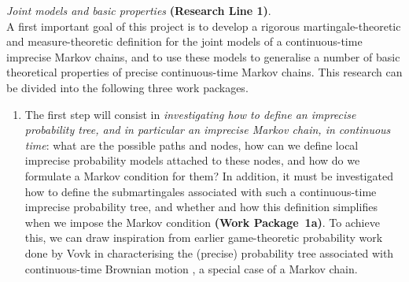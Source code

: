 \documentclass[11pt,dvipsnames,usenames,a4paper]{article}
\begin{document}
\emph{Joint models and basic properties} {\bf (Research Line 1)}.\\[3pt]
A first important goal of this project is to develop a rigorous martingale-theoretic and measure-theoretic definition for the joint models of a continuous-time imprecise Markov chains, and to use these models to generalise a number of basic theoretical properties of precise continuous-time Markov chains. 
This research can be divided into the following three work packages.
\begin{enumerate}[label=\tiny$\blacksquare$,leftmargin=*,noitemsep]
\item The first step will consist in \emph{investigating how to define an imprecise probability tree, and in particular an imprecise Markov chain, in continuous time}: what are the possible paths and nodes, how can we define local imprecise probability models attached to these nodes, and how do we formulate a Markov condition for them?
In addition, it must be investigated how to define the submartingales associated with such a continuous-time imprecise probability tree, and whether and how this definition simplifies when we impose the Markov condition {\bf(Work Package~1a)}.
To achieve this, we can draw inspiration from earlier game-theoretic probability work done by Vovk in characterising the (precise) probability tree associated with continuous-time Brownian motion \cite{vovk2008:brownian,vovk2012:emergence:of:probability}, a special case of a Markov chain.

\end{enumerate}
\end{document}
